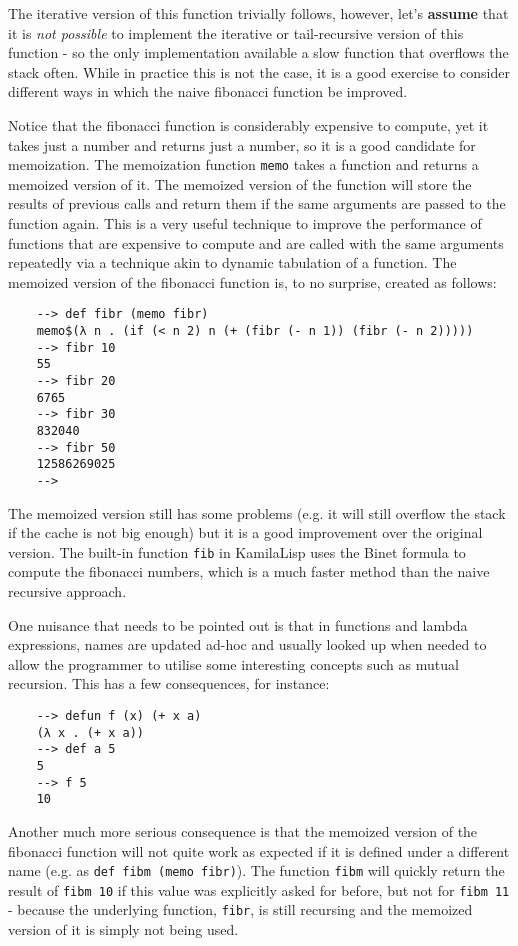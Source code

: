The iterative version of this function trivially follows, however, let's \textbf{assume} that it is \textit{not possible} to implement the iterative or tail-recursive version of this function - so the only implementation available a slow function that overflows the stack often. While in practice this is not the case, it is a good exercise to consider different ways in which the naive fibonacci function be improved.

Notice that the fibonacci function is considerably expensive to compute, yet it takes just a number and returns just a number, so it is a good candidate for memoization. The memoization function \verb|memo| takes a function and returns a memoized version of it. The memoized version of the function will store the results of previous calls and return them if the same arguments are passed to the function again. This is a very useful technique to improve the performance of functions that are expensive to compute and are called with the same arguments repeatedly via a technique akin to dynamic tabulation of a function. The memoized version of the fibonacci function is, to no surprise, created as follows:

\begin{Verbatim}
    --> def fibr (memo fibr)
    memo$(λ n . (if (< n 2) n (+ (fibr (- n 1)) (fibr (- n 2)))))
    --> fibr 10
    55
    --> fibr 20
    6765
    --> fibr 30
    832040
    --> fibr 50
    12586269025
    -->
\end{Verbatim}

The memoized version still has some problems (e.g. it will still overflow the stack if the cache is not big enough) but it is a good improvement over the original version. The built-in function \verb|fib| in KamilaLisp uses the Binet formula to compute the fibonacci numbers, which is a much faster method than the naive recursive approach.

One nuisance that needs to be pointed out is that in functions and lambda expressions, names are updated ad-hoc and usually looked up when needed to allow the programmer to utilise some interesting concepts such as mutual recursion. This has a few consequences, for instance:

\begin{Verbatim}
    --> defun f (x) (+ x a)
    (λ x . (+ x a))
    --> def a 5
    5
    --> f 5
    10
\end{Verbatim}

Another much more serious consequence is that the memoized version of the fibonacci function will not quite work as expected if it is defined under a different name (e.g. as \verb|def fibm (memo fibr)|). The function \verb|fibm| will quickly return the result of \verb|fibm 10| if this value was explicitly asked for before, but not for \verb|fibm 11| - because the underlying function, \verb|fibr|, is still recursing and the memoized version of it is simply not being used.

